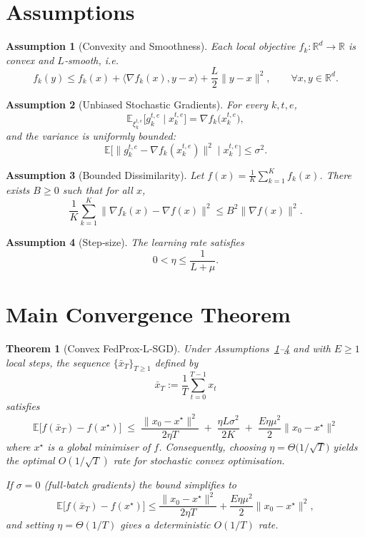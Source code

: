 \documentclass{article}
\newtheorem{theorem}{Theorem}
\newtheorem{assumption}{Assumption}
\newcommand{\E}{\mathbb{E}}
\newcommand{\R}{\mathbb{R}}
\begin{document}
\newpage
\section*{Assumptions}
\begin{assumption}[Convexity and Smoothness]\label{ass:convex_smooth}
Each local objective $f_k:\R^d\to\R$ is convex and $L$‑smooth, i.e.
\[
f_k(y)\le f_k(x)+\langle\nabla f_k(x),y-x\rangle+\frac{L}{2}\|y-x\|^2,\qquad\forall x,y\in\R^d.
\]
\end{assumption}
\begin{assumption}[Unbiased Stochastic Gradients]\label{ass:unbiased}
For every $k,t,e$,
\[
\E_{\xi_{k}^{t,e}}\!\bigl[g_{k}^{t,e}\mid x_{k}^{t,e}\bigr]=\nabla f_k\!\bigl(x_{k}^{t,e}\bigr),
\]
and the variance is uniformly bounded:
\[
\E\!\bigl[\|g_{k}^{t,e}-\nabla f_k(x_{k}^{t,e})\|^2\mid x_{k}^{t,e}\bigr]\le\sigma^2 .
\]
\end{assumption}
\begin{assumption}[Bounded Dissimilarity]\label{ass:dissimilarity}
Let $f(x)=\frac1K\sum_{k=1}^K f_k(x)$. There exists $B\ge0$ such that for all $x$,
\[
\frac1K\sum_{k=1}^K\|\nabla f_k(x)-\nabla f(x)\|^2\le B^2\|\nabla f(x)\|^2 .
\]
\end{assumption}
\begin{assumption}[Step‑size]\label{ass:stepsize}
The learning rate satisfies
\[
0<\eta\le\frac{1}{L+\mu}.
\]
\end{assumption}

\section*{Main Convergence Theorem}
\begin{theorem}[Convex FedProx‑L‑SGD]\label{thm:convex}
Under Assumptions~\ref{ass:convex_smooth}–\ref{ass:stepsize} and with $E\ge1$ local steps, the sequence $\{\bar x_T\}_{T\ge1}$ defined by 
\[
\bar x_T:=\frac1T\sum_{t=0}^{T-1}x_t
\]
satisfies
\[
\boxed{\;
\E\!\bigl[f(\bar x_T)-f(x^\star)\bigr]\;\le\;
\frac{\|x_0-x^\star\|^2}{2\eta T}
\;+\;
\frac{\eta L\sigma^2}{2K}
\;+\;
\frac{E\eta\mu^2}{2}\|x_0-x^\star\|^2
\;}
\tag{1}
\]
where $x^\star$ is a global minimiser of $f$. Consequently, choosing $\eta=\Theta\!\bigl(1/\sqrt{T}\bigr)$ yields the optimal $O(1/\sqrt{T})$ rate for stochastic convex optimisation.

If $\sigma=0$ (full‑batch gradients) the bound simplifies to
\[
\E\!\bigl[f(\bar x_T)-f(x^\star)\bigr]\le\frac{\|x_0-x^\star\|^2}{2\eta T}
+\frac{E\eta\mu^2}{2}\|x_0-x^\star\|^2,
\]
and setting $\eta=\Theta(1/T)$ gives a deterministic $O(1/T)$ rate.
\end{theorem}
\end{document}
